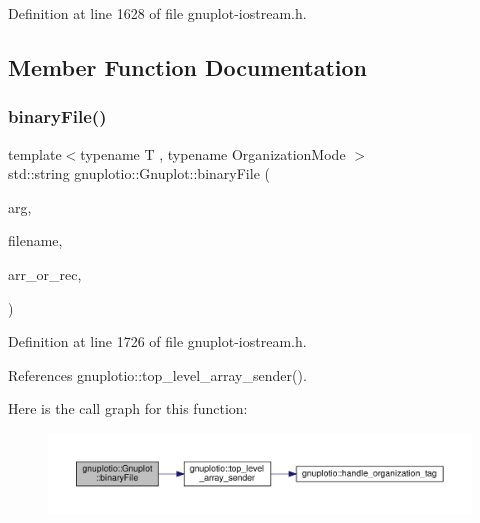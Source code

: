 Definition at line 1628 of file gnuplot-\/iostream.\+h.



\subsection{Member Function Documentation}
\mbox{\label{classgnuplotio_1_1_gnuplot_ad90501e6dbab5379abcd76fd0e2e4ef1}} 
\subsubsection{\texorpdfstring{binary\+File()}{binaryFile()}}
{\footnotesize\ttfamily template$<$typename T , typename Organization\+Mode $>$ \\
std\+::string gnuplotio\+::\+Gnuplot\+::binary\+File (\begin{DoxyParamCaption}\item[{const T \&}]{arg,  }\item[{std\+::string}]{filename,  }\item[{const std\+::string \&}]{arr\+\_\+or\+\_\+rec,  }\item[{Organization\+Mode}]{ }\end{DoxyParamCaption})\hspace{0.3cm}{\ttfamily [inline]}}



Definition at line 1726 of file gnuplot-\/iostream.\+h.



References gnuplotio\+::top\+\_\+level\+\_\+array\+\_\+sender().

Here is the call graph for this function\+:\nopagebreak
\begin{figure}[H]
\begin{center}
\leavevmode
\includegraphics[width=350pt]{classgnuplotio_1_1_gnuplot_ad90501e6dbab5379abcd76fd0e2e4ef1_cgraph}
\end{center}
\end{figure}
\mbox{\label{classgnuplotio_1_1_gnuplot_a43fe103649ec168b453c43aecdacce81}} 
